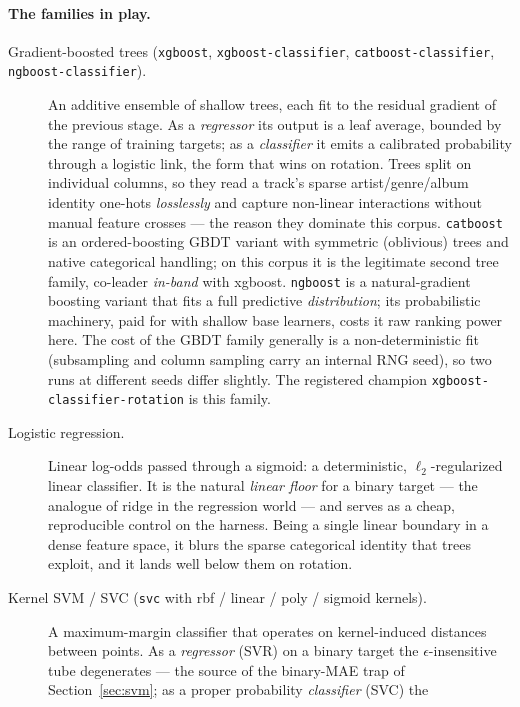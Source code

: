 \documentclass[11pt]{article}
\begin{document}
\paragraph{The families in play.}
\begin{description}
  \item[Gradient-boosted trees (\texttt{xgboost}, \texttt{xgboost-classifier},
  \texttt{catboost-classifier}, \texttt{ngboost-classifier}).]
  An additive ensemble of shallow trees, each fit to the residual gradient of
  the previous stage. As a \emph{regressor} its output is a leaf average,
  bounded by the range of training targets; as a \emph{classifier} it emits a
  calibrated probability through a logistic link, the form that wins on
  rotation. Trees split on individual columns, so they read a track's sparse
  artist/genre/album identity one-hots \emph{losslessly} and capture non-linear
  interactions without manual feature crosses --- the reason they dominate this
  corpus. \texttt{catboost} is an ordered-boosting GBDT variant with symmetric
  (oblivious) trees and native categorical handling; on this corpus it is the
  legitimate second tree family, co-leader \emph{in-band} with xgboost.
  \texttt{ngboost} is a natural-gradient boosting variant that fits a full
  predictive \emph{distribution}; its probabilistic machinery, paid for with
  shallow base learners, costs it raw ranking power here. The cost of the GBDT
  family generally is a non-deterministic fit (subsampling and column sampling
  carry an internal RNG seed), so two runs at different seeds differ slightly.
  The registered champion \texttt{xgboost-classifier-rotation} is this family.
  \item[Logistic regression.] Linear log-odds passed through a sigmoid: a
  deterministic, $\ell_2$-regularized linear classifier. It is the natural
  \emph{linear floor} for a binary target --- the analogue of ridge in the
  regression world --- and serves as a cheap, reproducible control on the
  harness. Being a single linear boundary in a dense feature space, it blurs
  the sparse categorical identity that trees exploit, and it lands well below
  them on rotation.
  \item[Kernel SVM / SVC (\texttt{svc} with rbf / linear / poly / sigmoid
  kernels).] A maximum-margin classifier that operates on kernel-induced
  distances between points. As a \emph{regressor} (SVR) on a binary target the
  $\epsilon$-insensitive tube degenerates --- the source of the binary-MAE trap
  of Section~\ref{sec:svm}; as a proper probability \emph{classifier} (SVC) the

\end{description}
\end{document}
